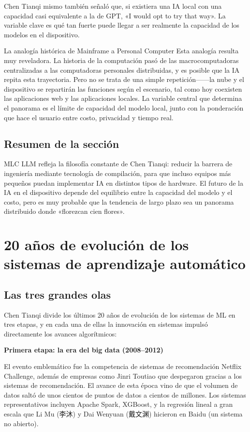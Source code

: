 \documentclass[a4paper]{article}
\begin{document}
Chen Tianqi mismo también señaló que, si existiera una IA local con una capacidad casi equivalente a la de GPT, «I would opt to try that way». La variable clave es qué tan fuerte puede llegar a ser realmente la capacidad de los modelos en el dispositivo.

\begin{knowledgebox}{La analogía histórica de Mainframe a Personal Computer}
Esta analogía resulta muy reveladora. La historia de la computación pasó de las macrocomputadoras centralizadas a las computadoras personales distribuidas, y es posible que la IA repita esta trayectoria. Pero no se trata de una simple repetición------la nube y el dispositivo se repartirán las funciones según el escenario, tal como hoy coexisten las aplicaciones web y las aplicaciones locales. La variable central que determina el panorama es el límite de capacidad del modelo local, junto con la ponderación que hace el usuario entre costo, privacidad y tiempo real.
\end{knowledgebox}

\subsection{Resumen de la sección}

MLC LLM refleja la filosofía constante de Chen Tianqi: reducir la barrera de ingeniería mediante tecnología de compilación, para que incluso equipos más pequeños puedan implementar IA en distintos tipos de hardware. El futuro de la IA en el dispositivo depende del equilibrio entre la capacidad del modelo y el costo, pero es muy probable que la tendencia de largo plazo sea un panorama distribuido donde «florezcan cien flores».
\section{20 años de evolución de los sistemas de aprendizaje automático}

\subsection{Las tres grandes olas}

Chen Tianqi divide los últimos 20 años de evolución de los sistemas de ML en tres etapas, y en cada una de ellas la innovación en sistemas impulsó directamente los avances algorítmicos:

\textbf{Primera etapa: la era del big data (2008--2012)}

El evento emblemático fue la competencia de sistemas de recomendación Netflix Challenge, además de empresas como Jinri Toutiao que despegaron gracias a los sistemas de recomendación. El avance de esta época vino de que el volumen de datos saltó de unos cientos de puntos de datos a cientos de millones. Los sistemas representativos incluyen Apache Spark, XGBoost, y la regresión lineal a gran escala que Li Mu (李沐) y Dai Wenyuan (戴文渊) hicieron en Baidu (un sistema no abierto).
\end{document}
